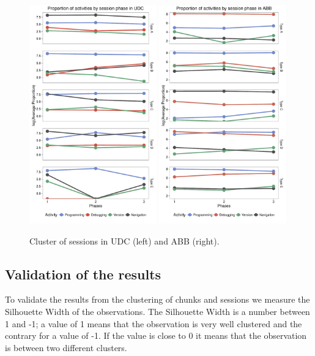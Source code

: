\begin{figure}[!ht]
	\caption{Cluster of sessions in UDC (left) and ABB (right).}
	\centering
	\includegraphics[width=0.49\textwidth]{Figures/UDC_phases_log}
	\includegraphics[width=0.49\textwidth]{Figures/ABB_phases_log}
	\label{ABB_phases}
\end{figure}


\subsection{Validation of the results}
To validate the results from the clustering of chunks and sessions we measure the Silhouette Width of the observations. The Silhouette Width is a number between 1 and -1; a value of 1 means that the observation is very well clustered and the contrary for a value of -1. If the value is close to 0 it means that the observation is between two different clusters.

